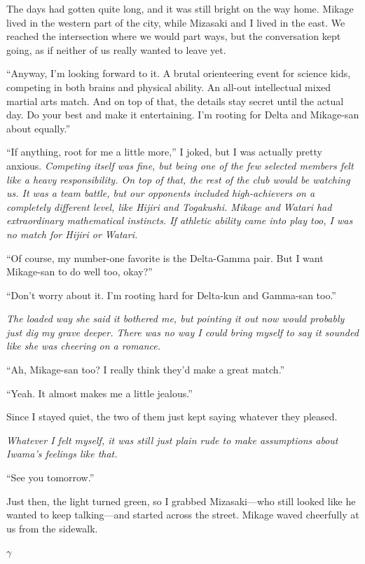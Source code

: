 \documentclass[
    a4paper,
    12pt,
    twoside,
    openany,
    UTF8,
    fontset=windows
]{ctexbook}
\begin{document}
The days had gotten quite long, and it was still bright on the way home. Mikage lived in the western part of the city, while Mizasaki and I lived in the east. We reached the intersection where we would part ways, but the conversation kept going, as if neither of us really wanted to leave yet.

``Anyway, I'm looking forward to it. A brutal orienteering event for science kids, competing in both brains and physical ability. An all-out intellectual mixed martial arts match. And on top of that, the details stay secret until the actual day. Do your best and make it entertaining. I'm rooting for Delta and Mikage-san about equally.''

``If anything, root for me a little more,'' I joked, but I was actually pretty anxious. \textit{Competing itself was fine, but being one of the few selected members felt like a heavy responsibility. On top of that, the rest of the club would be watching us. It was a team battle, but our opponents included high-achievers on a completely different level, like Hijiri and Togakushi. Mikage and Watari had extraordinary mathematical instincts. If athletic ability came into play too, I was no match for Hijiri or Watari.}

``Of course, my number-one favorite is the Delta-Gamma pair. But I want Mikage-san to do well too, okay?''

``Don't worry about it. I'm rooting hard for Delta-kun and Gamma-san too.''

\textit{The loaded way she said it bothered me, but pointing it out now would probably just dig my grave deeper. There was no way I could bring myself to say it sounded like she was cheering on a romance.}

``Ah, Mikage-san too? I really think they'd make a great match.''

``Yeah. It almost makes me a little jealous.''

Since I stayed quiet, the two of them just kept saying whatever they pleased.

\textit{Whatever I felt myself, it was still just plain rude to make assumptions about Iwama's feelings like that.}

``See you tomorrow.''

Just then, the light turned green, so I grabbed Mizasaki---who still looked like he wanted to keep talking---and started across the street. Mikage waved cheerfully at us from the sidewalk.

$\gamma$
\end{document}
